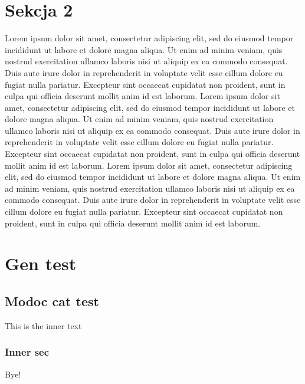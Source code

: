 \documentclass{article}
\begin{document}
\section{Sekcja 2}
Lorem ipsum dolor sit amet, consectetur adipiscing elit, sed do eiusmod tempor incididunt ut labore et dolore magna aliqua. Ut enim ad minim veniam, quis nostrud exercitation ullamco laboris nisi ut aliquip ex ea commodo consequat. Duis aute irure dolor in reprehenderit in voluptate velit esse cillum dolore eu fugiat nulla pariatur. Excepteur sint occaecat cupidatat non proident, sunt in culpa qui officia deserunt mollit anim id est laborum. Lorem ipsum dolor sit amet, consectetur adipiscing elit, sed do eiusmod tempor incididunt ut labore et dolore magna aliqua. Ut enim ad minim veniam, quis nostrud exercitation ullamco laboris nisi ut aliquip ex ea commodo consequat. Duis aute irure dolor in reprehenderit in voluptate velit esse cillum dolore eu fugiat nulla pariatur. Excepteur sint occaecat cupidatat non proident, sunt in culpa qui officia deserunt mollit anim id est laborum. 
Lorem ipsum dolor sit amet, consectetur adipiscing elit, sed do eiusmod tempor incididunt ut labore et dolore magna aliqua. Ut enim ad minim veniam, quis nostrud exercitation ullamco laboris nisi ut aliquip ex ea commodo consequat. Duis aute irure dolor in reprehenderit in voluptate velit esse cillum dolore eu fugiat nulla pariatur. Excepteur sint occaecat cupidatat non proident, sunt in culpa qui officia deserunt mollit anim id est laborum. 
\section{Gen test}
\subsection{Modoc cat test}
This is the inner text 
\subsubsection{Inner sec}
Bye! 
\end{document}
